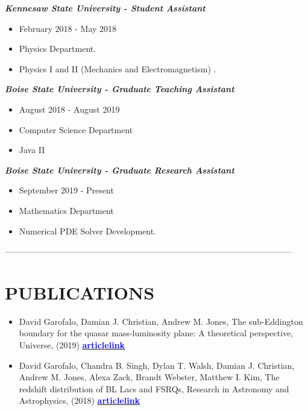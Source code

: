 \documentclass[margin, 10pt]{res} %
\begin{document}
\begin{resume}
{\sl \textbf{Kennesaw State University - Student Assistant}}  \\
\begin{itemize}
\item February 2018 - May 2018
\item Physics Department.
\item Physics I and II (Mechanics and Electromagnetism) .
\end{itemize}
 
{\sl \textbf{Boise State University - Graduate Teaching Assistant}} \\
\begin{itemize} 
\item August 2018 - August 2019
\item Computer Science Department
\item Java II
\end{itemize} 

{\sl \textbf{Boise State University - Graduate Research Assistant}} \\
\begin{itemize}
\item September 2019 - Present 
\item Mathematics Department
\item Numerical PDE Solver Development.
\end{itemize} 


------------------------------------------------------------------------------------------------------

\section{PUBLICATIONS}

\begin{itemize}
\item David Garofalo, Damian J. Christian, Andrew M. Jones, The sub-Eddington boundary for the quasar mass-luminosity plane: A theoretical perspective, Universe, (2019) \href{https://www.mdpi.com/2218-1997/5/6/145}{\underline{\textcolor{blue}{\textbf{articlelink}}}}

\item David Garofalo, Chandra B. Singh, Dylan T. Walsh, Damian J. Christian, Andrew M. Jones, Alexa Zack, Brandt Webster, Matthew I. Kim, The redshift distribution of BL Lacs and FSRQs, Research in Astronomy and Astrophysics, (2018) \href{https://iopscience.iop.org/article/10.1088/1674-4527/19/1/13/meta}{\underline{\textcolor{blue}{\textbf{articlelink}}}}
\end{itemize}


\end{resume}
\end{document}

